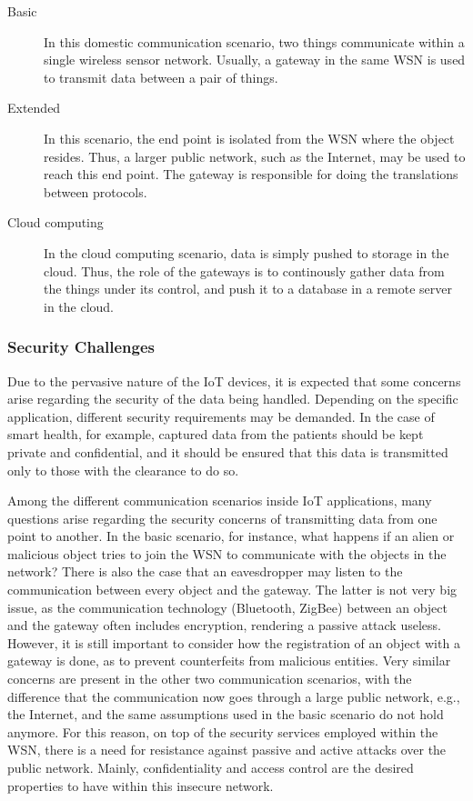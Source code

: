 \documentclass[12pt]{article}
\begin{document}
\begin{description}
\item[Basic] In this domestic communication scenario, two things communicate within a single wireless sensor network. Usually, a gateway in the same WSN is used to transmit data between a pair of things.
\item[Extended] In this scenario, the end point is isolated from the WSN where the object resides. Thus, a larger public network, such as the Internet, may be used to reach this end point. The gateway is responsible for doing the translations between protocols.
\item[Cloud computing] In the cloud computing scenario, data is simply pushed to storage in the cloud. Thus, the role of the gateways is to continously gather data from the things under its control, and push it to a database in a remote server in the cloud.
\end{description} 

\subsubsection{Security Challenges}

Due to the pervasive nature of the IoT devices, it is expected that some concerns arise regarding the security of the data being handled. Depending on the specific application, different security requirements may be demanded. In the case of smart health, for example, captured data from the patients should be kept private and confidential, and it should be ensured that this data is transmitted only to those with the clearance to do so.

Among the different communication scenarios inside IoT applications, many questions arise regarding the security concerns of transmitting data from one point to another. In the basic scenario, for instance, what happens if an alien or malicious object tries to join the WSN to communicate with the objects in the network? There is also the case that an eavesdropper may listen to the communication between every object and the gateway. The latter is not very big issue, as the communication technology (Bluetooth, ZigBee) between an object and the gateway often includes encryption, rendering a passive attack useless. However, it is still important to consider how the registration of an object with a gateway is done, as to prevent counterfeits from malicious entities. Very similar concerns are present in the other two communication scenarios, with the difference that the communication now goes through a large public network, e.g., the Internet, and the same assumptions used in the basic scenario do not hold anymore. For this reason, on top of the security services employed within the WSN, there is a need for resistance against passive and active attacks over the public network. Mainly, confidentiality and access control are the desired properties to have within this insecure network.
\end{document}
